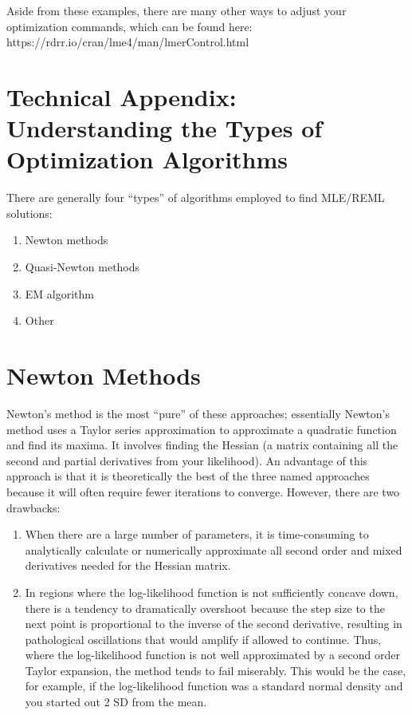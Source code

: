 \documentclass[
  letterpaper,
  DIV=11,
  numbers=noendperiod]{scrreprt}
\begin{document}
Aside from these examples, there are many other ways to adjust your
optimization commands, which can be found here:
https://rdrr.io/cran/lme4/man/lmerControl.html

\hypertarget{technical-appendix-understanding-the-types-of-optimization-algorithms}{%
\section{Technical Appendix: Understanding the Types of Optimization
Algorithms}\label{technical-appendix-understanding-the-types-of-optimization-algorithms}}

There are generally four ``types'' of algorithms employed to find
MLE/REML solutions:

\begin{enumerate}
\item Newton methods 
\item Quasi-Newton methods
\item EM algorithm 
\item Other
\end{enumerate}

\hypertarget{newton-methods}{%
\section{Newton Methods}\label{newton-methods}}

Newton's method is the most ``pure'' of these approaches; essentially
Newton's method uses a Taylor series approximation to approximate a
quadratic function and find its maxima. It involves finding the Hessian
(a matrix containing all the second and partial derivatives from your
likelihood). An advantage of this approach is that it is theoretically
the best of the three named approaches because it will often require
fewer iterations to converge. However, there are two drawbacks:

\begin{enumerate}
\item When there are a large number of parameters, it is time-consuming to analytically calculate or numerically approximate all second order and mixed derivatives needed for the Hessian matrix.
\item In regions where the log-likelihood function is not sufficiently concave down, there is a tendency to dramatically overshoot because the step size to the next point is proportional to the inverse of the second derivative, resulting in pathological oscillations that would amplify if allowed to continue. Thus, where the log-likelihood function is not well approximated by a second order Taylor expansion, the method tends to fail miserably. This would be the case, for example, if the log-likelihood function was a standard normal density and you started out 2 SD from the mean.
\end{enumerate}
\end{document}
